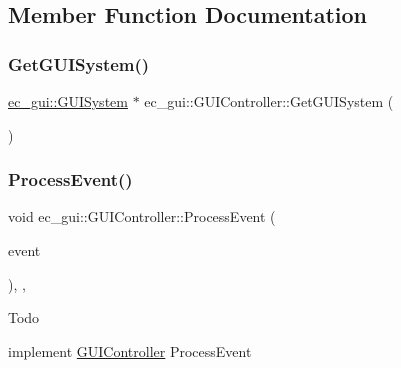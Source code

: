 \subsection{Member Function Documentation}
\mbox{\label{classec__gui_1_1_g_u_i_controller_ad4d8b46c9f7028fe545b479abdaab9d6}} 
\subsubsection{\texorpdfstring{Get\+G\+U\+I\+System()}{GetGUISystem()}}
{\footnotesize\ttfamily \mbox{\hyperlink{classec__gui_1_1_g_u_i_system}{ec\+\_\+gui\+::\+G\+U\+I\+System}} $\ast$ ec\+\_\+gui\+::\+G\+U\+I\+Controller\+::\+Get\+G\+U\+I\+System (\begin{DoxyParamCaption}{ }\end{DoxyParamCaption})}

\mbox{\label{classec__gui_1_1_g_u_i_controller_a3d9e413ddf78d41e929ec652c5409f3c}} 
\subsubsection{\texorpdfstring{Process\+Event()}{ProcessEvent()}}
{\footnotesize\ttfamily void ec\+\_\+gui\+::\+G\+U\+I\+Controller\+::\+Process\+Event (\begin{DoxyParamCaption}\item[{const \mbox{\hyperlink{structec_1_1_input_event}{ec\+::\+Input\+Event}} \&}]{event }\end{DoxyParamCaption})\hspace{0.3cm}{\ttfamily [override]}, {\ttfamily [protected]}, {\ttfamily [virtual]}}

\begin{DoxyRefDesc}{Todo}
\item[\mbox{\hyperlink{todo__todo000009}{Todo}}]implement \mbox{\hyperlink{classec__gui_1_1_g_u_i_controller}{G\+U\+I\+Controller}} Process\+Event \end{DoxyRefDesc}


